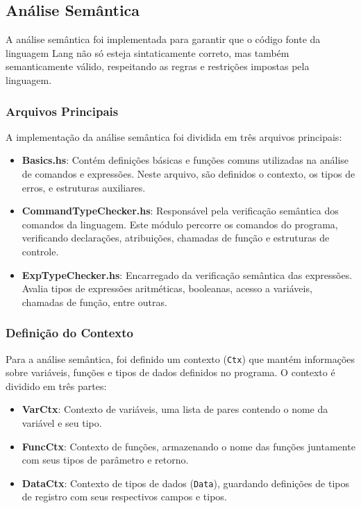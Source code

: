 \documentclass{article}
\begin{document}
\subsection{Análise Semântica}\label{desenvolvimento:análise-semântica}

A análise semântica foi implementada para garantir que o código fonte da linguagem Lang não só esteja sintaticamente correto, mas também semanticamente válido, respeitando as regras e restrições impostas pela linguagem.

\subsubsection{Arquivos Principais}

A implementação da análise semântica foi dividida em três arquivos principais:

\begin{itemize}
    \item \textbf{Basics.hs}: Contém definições básicas e funções comuns utilizadas na análise de comandos e expressões. Neste arquivo, são definidos o contexto, os tipos de erros, e estruturas auxiliares.
    \item \textbf{CommandTypeChecker.hs}: Responsável pela verificação semântica dos comandos da linguagem. Este módulo percorre os comandos do programa, verificando declarações, atribuições, chamadas de função e estruturas de controle.
    \item \textbf{ExpTypeChecker.hs}: Encarregado da verificação semântica das expressões. Avalia tipos de expressões aritméticas, booleanas, acesso a variáveis, chamadas de função, entre outras.
\end{itemize}

\subsubsection{Definição do Contexto}

Para a análise semântica, foi definido um contexto (\texttt{Ctx}) que mantém informações sobre variáveis, funções e tipos de dados definidos no programa. O contexto é dividido em três partes:

\begin{itemize}
    \item \textbf{VarCtx}: Contexto de variáveis, uma lista de pares contendo o nome da variável e seu tipo.
    \item \textbf{FuncCtx}: Contexto de funções, armazenando o nome das funções juntamente com seus tipos de parâmetro e retorno.
    \item \textbf{DataCtx}: Contexto de tipos de dados (\texttt{Data}), guardando definições de tipos de registro com seus respectivos campos e tipos.
\end{itemize}
\end{document}
